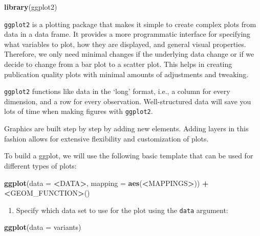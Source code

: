 \documentclass[
]{book}
\newenvironment{Shaded}{\begin{snugshade}}{\end{snugshade}}
\newcommand{\AttributeTok}[1]{\textcolor[rgb]{0.13,0.29,0.53}{#1}}
\newcommand{\ErrorTok}[1]{\textcolor[rgb]{0.64,0.00,0.00}{\textbf{#1}}}
\newcommand{\FunctionTok}[1]{\textcolor[rgb]{0.13,0.29,0.53}{\textbf{#1}}}
\newcommand{\NormalTok}[1]{#1}
\newcommand{\SpecialCharTok}[1]{\textcolor[rgb]{0.81,0.36,0.00}{\textbf{#1}}}
\providecommand{\tightlist}{%
  \setlength{\itemsep}{0pt}\setlength{\parskip}{0pt}}
\begin{document}
\begin{Shaded}
\begin{Highlighting}[]
\FunctionTok{library}\NormalTok{(ggplot2)}
\end{Highlighting}
\end{Shaded}

\texttt{ggplot2} is a plotting package that makes it simple to create complex plots from data in a data frame. It provides a more programmatic interface for specifying what variables to plot, how they are displayed, and general visual properties. Therefore, we only need minimal changes if the underlying data change or if we decide to change from a bar plot to a scatter plot. This helps in creating publication quality plots with minimal amounts of adjustments and tweaking.

\texttt{ggplot2} functions like data in the `long' format, i.e., a column for every dimension, and a row for every observation. Well-structured data will save you lots of time when making figures with \texttt{ggplot2}.

Graphics are built step by step by adding new elements. Adding layers in this fashion allows for extensive flexibility and customization of plots.

To build a ggplot, we will use the following basic template that can be used for different types of plots:

\begin{Shaded}
\begin{Highlighting}[]
\FunctionTok{ggplot}\NormalTok{(}\AttributeTok{data =} \SpecialCharTok{\textless{}}\NormalTok{DATA}\SpecialCharTok{\textgreater{}}\NormalTok{, }\AttributeTok{mapping =} \FunctionTok{aes}\NormalTok{(}\SpecialCharTok{\textless{}}\NormalTok{MAPPINGS}\SpecialCharTok{\textgreater{}}\NormalTok{)) }\SpecialCharTok{+}  \ErrorTok{\textless{}}\NormalTok{GEOM\_FUNCTION}\SpecialCharTok{\textgreater{}}\NormalTok{()}
\end{Highlighting}
\end{Shaded}

\begin{enumerate}
\def\labelenumi{\arabic{enumi}.}
\tightlist
\item
  Specify which data set to use for the plot using the \texttt{data} argument:
\end{enumerate}

\begin{Shaded}
\begin{Highlighting}[]
\FunctionTok{ggplot}\NormalTok{(}\AttributeTok{data =}\NormalTok{ variants)}
\end{Highlighting}
\end{Shaded}
\end{document}
